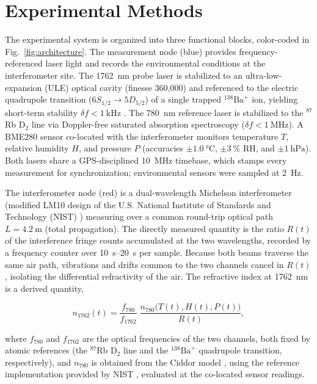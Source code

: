 \documentclass[aps,prapplied,reprint,groupedaddress,twocolumn,superscriptaddress,linenumbers]{revtex4-2}
\begin{document}
\section{Experimental Methods}
\label{sec:methods}

The experimental system is organized into three functional blocks, color-coded in Fig.~\ref{fig:architecture}. The measurement node (blue) provides frequency-referenced laser light and records the environmental conditions at the interferometer site. The \SI{1762}{\nano\meter} probe laser is stabilized to an ultra-low-expansion (ULE) optical cavity (finesse 360,000) and referenced to the electric quadrupole transition ($6S_{1/2} \rightarrow 5D_{5/2}$) of a single trapped $^{138}\mathrm{Ba}^+$ ion, yielding short-term stability $\delta f < \SI{1}{\kilo\hertz}$ \cite{yum2017optical,arnold2020precision}. The \SI{780}{\nano\meter} reference laser is stabilized to the $^{87}$Rb D$_2$ line via Doppler-free saturated absorption spectroscopy ($\delta f < \SI{1}{\mega\hertz}$). A BME280 sensor \cite{bme280} co-located with the interferometer monitors temperature $T$, relative humidity $H$, and pressure $P$ (accuracies $\pm\SI{1.0}{\degreeCelsius}$, $\pm\SI{3}{\percent}$ RH, and $\pm\SI{1}{\hecto\pascal}$). Both lasers share a GPS-disciplined \SI{10}{\mega\hertz} timebase, which stamps every measurement for synchronization; environmental sensors were sampled at \SI{2}{\hertz}.

The interferometer node (red) is a dual-wavelength Michelson interferometer (modified LM10 design of the U.S. National Institute of Standards and Technology (NIST) \cite{fox1999reliable}) measuring over a common round-trip optical path $L = \SI{4.2}{\meter}$ (total propagation). The directly measured quantity is the ratio $R(t)$ of the interference fringe counts accumulated at the two wavelengths, recorded by a frequency counter over \SIrange{10}{20}{\second} per sample. Because both beams traverse the same air path, vibrations and drifts common to the two channels cancel in $R(t)$, isolating the differential refractivity of the air. The refractive index at \SI{1762}{\nano\meter} is a derived quantity,

\begin{equation}
n_{1762}(t) = \frac{f_{780}}{f_{1762}}\; \frac{n_{780}\big(T(t),H(t),P(t)\big)}{R(t)},
\label{eqn:wavemeter}
\end{equation}

where $f_{780}$ and $f_{1762}$ are the optical frequencies of the two channels, both fixed by atomic references (the $^{87}$Rb D$_2$ line and the $^{138}\mathrm{Ba}^+$ quadrupole transition, respectively), and $n_{780}$ is obtained from the Ciddor model \cite{ciddor1996refractive}, using the reference implementation provided by NIST \cite{nist_refractiveindex}, evaluated at the co-located sensor readings.
\end{document}
